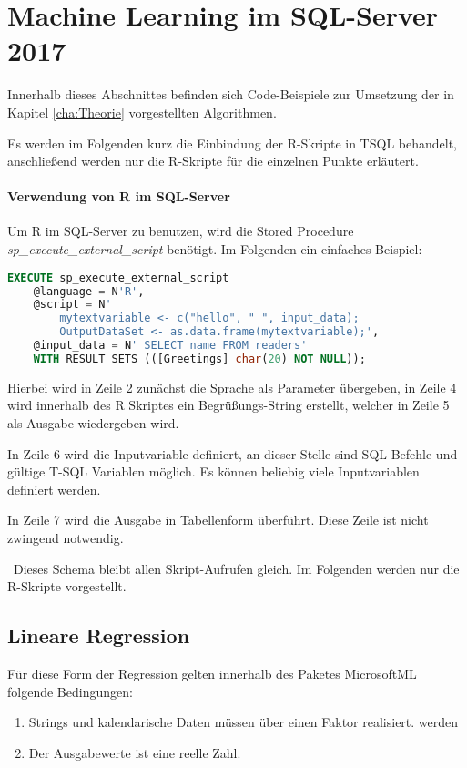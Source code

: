 \section{Machine Learning im SQL-Server 2017}
\label{sec:MLSQL} \label{sec:MachineLearning}
Innerhalb dieses Abschnittes befinden sich Code-Beispiele zur Umsetzung der in Kapitel \ref{cha:Theorie} vorgestellten Algorithmen. 

Es werden im Folgenden kurz die Einbindung der R-Skripte in TSQL behandelt, anschließend werden nur die R-Skripte für die einzelnen Punkte erläutert.

\paragraph{Verwendung von R im SQL-Server}
Um R im SQL-Server zu benutzen, wird die Stored Procedure \textit{sp\_execute\_external\_script} benötigt. Im Folgenden ein einfaches Beispiel: ~\newline

\begin{lstlisting}[language=SQL]
	EXECUTE sp_execute_external_script
	@language = N'R',
	@script = N' 
		mytextvariable <- c("hello", " ", input_data);
		OutputDataSet <- as.data.frame(mytextvariable);',
	@input_data = N' SELECT name FROM readers'
	WITH RESULT SETS (([Greetings] char(20) NOT NULL));
\end{lstlisting}

Hierbei wird in Zeile 2 zunächst die Sprache als Parameter übergeben, in Zeile 4 wird innerhalb des R Skriptes ein Begrüßungs-String erstellt, welcher in Zeile 5 als Ausgabe wiedergeben wird.

In Zeile 6 wird die Inputvariable definiert, an dieser Stelle sind SQL Befehle und gültige T-SQL Variablen möglich. Es können beliebig viele Inputvariablen definiert werden. 

In Zeile 7 wird die Ausgabe in Tabellenform überführt. Diese Zeile ist nicht zwingend notwendig.  

~\newline Dieses Schema bleibt allen Skript-Aufrufen gleich. Im Folgenden werden nur die R-Skripte vorgestellt.
\subsection{Lineare Regression}
Für diese Form der Regression gelten innerhalb des Paketes MicrosoftML folgende Bedingungen: ~\newline
\begin{enumerate}
	\item Strings und kalendarische Daten müssen über einen Faktor realisiert. werden 
	\item Der Ausgabewerte ist eine reelle Zahl.
\end{enumerate}

